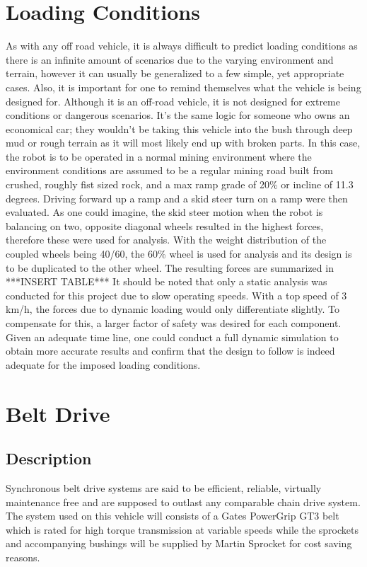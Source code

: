 \section{Loading Conditions}
As with any off road vehicle, it is always difficult to predict loading conditions as there is an infinite amount of scenarios due to the varying environment and terrain, however it can usually be generalized to a few simple, yet appropriate cases. Also, it is important for one to remind themselves what the vehicle is being designed for. Although it is an off-road vehicle, it is not designed for extreme conditions or dangerous scenarios. It's the same logic for someone who owns an economical car; they wouldn't be taking this vehicle into the bush through deep mud or rough terrain as it will most likely end up with broken parts. In this case, the robot is to be operated in a normal mining environment where the environment conditions are assumed to be a regular mining road built from crushed, roughly fist sized rock, and a max ramp grade of 20\% or incline of 11.3 degrees. Driving forward up a ramp and a skid steer turn on a ramp were then evaluated. As one could imagine, the skid steer motion when the robot is balancing on two, opposite diagonal wheels resulted in the highest forces, therefore these were used for analysis. With the weight distribution of the coupled wheels being 40/60, the 60\% wheel is used for analysis and its design is to be duplicated to the other wheel. The resulting forces are summarized in     
\line
 ***INSERT TABLE***
\line
It should be noted that only a static analysis was conducted for this project due to slow operating speeds. With a top speed of 3 km/h, the forces due to dynamic loading would only differentiate slightly. To compensate for this, a larger factor of safety was desired for each component. Given an adequate time line, one could conduct a full dynamic simulation to obtain more accurate results and confirm that the design to follow is indeed adequate for the imposed loading conditions. 

\section{Belt Drive}
\subsection{Description}
Synchronous belt drive systems are said to be efficient, reliable, virtually maintenance free and are supposed to outlast any comparable chain drive system. The system used on this vehicle will consists of a Gates PowerGrip GT3 belt which is rated for high torque transmission at variable speeds while the sprockets and accompanying bushings will be supplied by Martin Sprocket for cost saving reasons.
